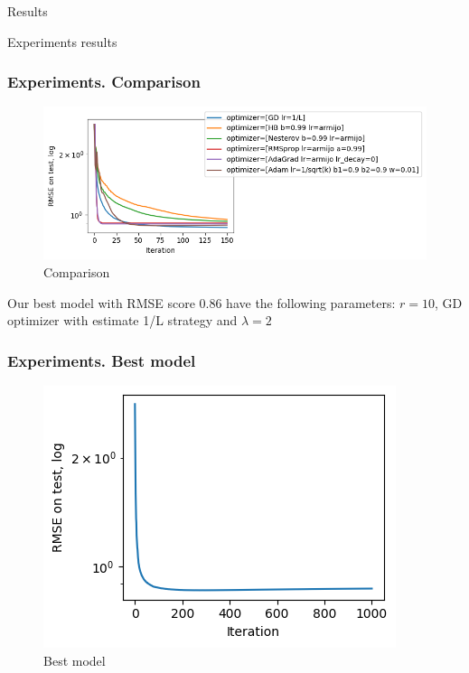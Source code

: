 \documentclass[pdf,10pt]{beamer}
\begin{document}
\begin{section}{Results}
\begin{subsection}{Experiments results}
   \begin{frame}
     \frametitle{Experiments. Comparison}
     \begin{figure}[H]
       \centering
       \includegraphics[width=\textwidth,keepaspectratio]{../data/comparison.png}
       \caption[Comparison]{Comparison}\label{fig:comparison}
     \end{figure}
   \end{frame}

   \begin{frame}
     Our best model with RMSE score 0.86 have the following parameters: $r=10$, GD optimizer with estimate 1/L strategy and $\lambda=2$
     \frametitle{Experiments. Best model}
     \begin{figure}[H]
       \centering
       \includegraphics[keepaspectratio, scale=0.6]{../data/final.png}
       \caption[Best model]{Best model}\label{fig:best}
     \end{figure}
   \end{frame}

 \end{subsection}
\end{section}
\end{document}
